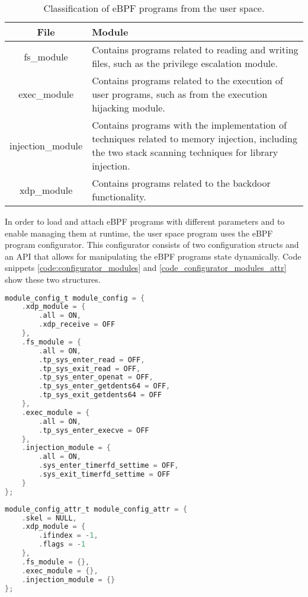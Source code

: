 \begin{table}[htbp]
\begin{tabular}{|c|>{\centering\arraybackslash}p{8cm}|}
\hline
\textbf{File} & \textbf{Module} \\
\hline
\hline
fs\_module & Contains programs related to reading and writing files, such as the privilege escalation module.\\
\hline
exec\_module & Contains programs related to the execution of user programs, such as from the execution hijacking module.\\
\hline
injection\_module & Contains programs with the implementation of techniques related to memory injection, including the two stack scanning techniques for library injection.\\
\hline
xdp\_module & Contains programs related to the backdoor functionality.\\
\hline
\end{tabular}
\caption{Classification of eBPF programs from the user space.}
\label{table:modules_list}
\end{table}

In order to load and attach eBPF programs with different parameters and 
to enable managing them at runtime, the user space program uses the eBPF program configurator. This configurator consists of two configuration structs and an API that allows for manipulating the eBPF programs state dynamically. Code snippets \ref{code:configurator_modules} and \ref{code_configurator_modules_attr} show these two structures.

\begin{lstlisting}[language=C, caption={Program configurator struct with list of modules.}, label={code:configurator_modules}]
module_config_t module_config = {
    .xdp_module = {
        .all = ON,
        .xdp_receive = OFF
    },
    .fs_module = {
        .all = ON,
        .tp_sys_enter_read = OFF,
        .tp_sys_exit_read = OFF,
        .tp_sys_enter_openat = OFF,
        .tp_sys_enter_getdents64 = OFF,
        .tp_sys_exit_getdents64 = OFF
    },
    .exec_module = {
        .all = ON,
        .tp_sys_enter_execve = OFF
    },
    .injection_module = {
        .all = ON,
        .sys_enter_timerfd_settime = OFF,
        .sys_exit_timerfd_settime = OFF
    }
};
\end{lstlisting}

\begin{lstlisting}[language=C, caption={Program configurator struct with attributes for each module.}, label={code:configurator_modules_attr}]
module_config_attr_t module_config_attr = {
    .skel = NULL,
    .xdp_module = {
        .ifindex = -1,
        .flags = -1
    },
    .fs_module = {},
    .exec_module = {},
    .injection_module = {}
};
\end{lstlisting}

